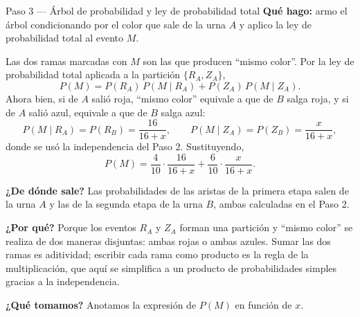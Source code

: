 \documentclass[11pt]{article}
\begin{document}
\begin{paso}{Paso 3 --- Árbol de probabilidad y ley de probabilidad total}
\textbf{Qué hago:} armo el árbol condicionando por el color que sale de la urna $A$ y aplico la ley de probabilidad total al evento $M$.

\begin{center}
\end{center}

Las dos ramas marcadas con $M$ son las que producen ``mismo color''. Por la ley de probabilidad total aplicada a la partición $\{R_A,Z_A\}$,
\[
P(M)=P(R_A)\,P(M\mid R_A)+P(Z_A)\,P(M\mid Z_A).
\]
Ahora bien, si de $A$ salió roja, ``mismo color'' equivale a que de $B$ salga roja, y si de $A$ salió azul, equivale a que de $B$ salga azul:
\[
P(M\mid R_A)=P(R_B)=\frac{16}{16+x},
\qquad
P(M\mid Z_A)=P(Z_B)=\frac{x}{16+x},
\]
donde se usó la independencia del Paso 2. Sustituyendo,
\[
P(M)=\frac{4}{10}\cdot\frac{16}{16+x}+\frac{6}{10}\cdot\frac{x}{16+x}.
\]

\textbf{¿De dónde sale?} Las probabilidades de las aristas de la primera etapa salen de la urna $A$ y las de la segunda etapa de la urna $B$, ambas calculadas en el Paso 2.

\textbf{¿Por qué?} Porque los eventos $R_A$ y $Z_A$ forman una partición y ``mismo color'' se realiza de dos maneras disjuntas: ambas rojas o ambas azules. Sumar las dos ramas es aditividad; escribir cada rama como producto es la regla de la multiplicación, que aquí se simplifica a un producto de probabilidades simples gracias a la independencia.

\textbf{¿Qué tomamos?} Anotamos la expresión de $P(M)$ en función de $x$.
\end{paso}
\end{document}
